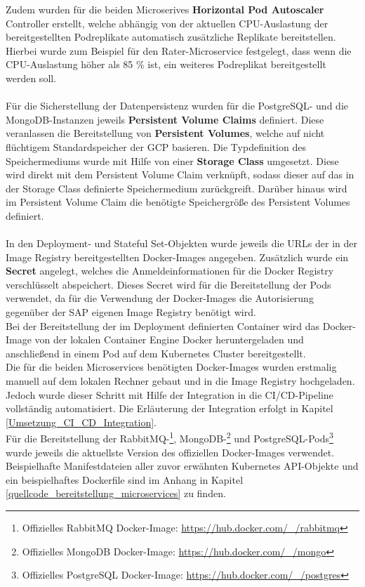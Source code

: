 Zudem wurden für die beiden Microserives \textbf{Horizontal Pod Autoscaler} Controller erstellt, welche abhängig von der aktuellen \ac{CPU}-Auslastung der bereitgestellten Podreplikate automatisch zusätzliche Replikate bereitstellen. Hierbei wurde zum Beispiel für den Rater-Microservice festgelegt, dass wenn die \ac{CPU}-Auslastung höher als 85 \% ist, ein weiteres Podreplikat bereitgestellt werden soll.\\
\\
Für die Sicherstellung der Datenpersistenz wurden für die PostgreSQL- und die MongoDB-Instanzen jeweils \textbf{Persistent Volume Claims} definiert. Diese veranlassen die Bereitstellung von \textbf{Persistent Volumes}, welche auf nicht flüchtigem Standardspeicher der \ac{GCP} basieren. Die Typdefinition des Speichermediums wurde mit Hilfe von einer \textbf{Storage Class} umgesetzt. Diese wird direkt mit dem Persistent Volume Claim verknüpft, sodass dieser auf das in der Storage Class definierte Speichermedium zurückgreift. Darüber hinaus wird im Persistent Volume Claim die benötigte Speichergröße des Persistent Volumes definiert. \autocite[Vgl.][S. 196, 198-199]{Luksa.2018}\\
\\
In den Deployment- und Stateful Set-Objekten wurde jeweils die \acsp{URL} der in der Image Registry bereitgestellten Docker-Images angegeben. Zusätzlich wurde ein \textbf{Secret} angelegt, welches die Anmeldeinformationen für die Docker Registry verschlüsselt abspeichert. Dieses Secret wird für die Bereitstellung der Pods verwendet, da für die Verwendung der Docker-Images die Autorisierung gegenüber der SAP eigenen Image Registry benötigt wird.\\
Bei der Bereitstellung der im Deployment definierten Container wird das Docker-Image von der lokalen Container Engine Docker heruntergeladen und anschließend in einem Pod auf dem Kubernetes Cluster bereitgestellt.\\
Die für die beiden Microservices benötigten Docker-Images wurden erstmalig manuell auf dem lokalen Rechner gebaut und in die Image Registry hochgeladen. Jedoch wurde dieser Schritt mit Hilfe der Integration in die \ac{CI}/\ac{CD}-Pipeline vollständig automatisiert. Die Erläuterung der Integration erfolgt in Kapitel \ref{Umsetzung_CI_CD_Integration}. \\
Für die Bereitstellung der RabbitMQ-\footnote{Offizielles RabbitMQ Docker-Image: \url{https://hub.docker.com/_/rabbitmq}}, MongoDB-\footnote{Offizielles MongoDB Docker-Image: \url{https://hub.docker.com/_/mongo}} und PostgreSQL-Pods\footnote{Offizielles PostgreSQL Docker-Image: \url{https://hub.docker.com/_/postgres}} wurde jeweils die aktuellste Version des offiziellen Docker-Images verwendet.\\
Beispielhafte Manifestdateien aller zuvor erwähnten Kubernetes \ac{API}-Objekte und ein beispielhaftes Dockerfile sind im Anhang in Kapitel \ref{quellcode_bereitstellung_microservices} zu finden.


